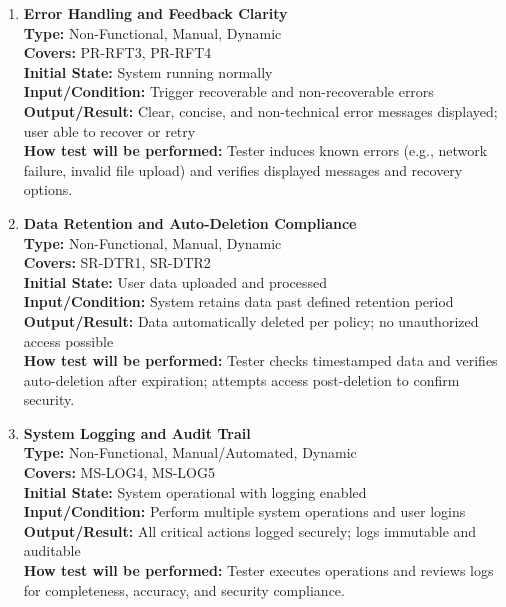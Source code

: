 \documentclass[12pt, titlepage]{article}
\begin{document}
\begin{enumerate}[label=NFR-ST \arabic*., wide=0pt, leftmargin=*]
  \item \textbf{Error Handling and Feedback Clarity} \\[2mm]
    \textbf{Type:} Non-Functional, Manual, Dynamic \\
    \textbf{Covers:} PR-RFT3, PR-RFT4 \\
    \textbf{Initial State:} System running normally \\
    \textbf{Input/Condition:} Trigger recoverable and non-recoverable errors \\
    \textbf{Output/Result:} Clear, concise, and non-technical error
    messages displayed; user able to recover or retry \\[2mm]
    \textbf{How test will be performed:} Tester induces known errors
    (e.g., network failure, invalid file upload) and verifies
    displayed messages and recovery options.

  \item \textbf{Data Retention and Auto-Deletion Compliance} \\[2mm]
    \textbf{Type:} Non-Functional, Manual, Dynamic \\
    \textbf{Covers:} SR-DTR1, SR-DTR2 \\
    \textbf{Initial State:} User data uploaded and processed \\
    \textbf{Input/Condition:} System retains data past defined
    retention period \\
    \textbf{Output/Result:} Data automatically deleted per policy; no
    unauthorized access possible \\[2mm]
    \textbf{How test will be performed:} Tester checks timestamped
    data and verifies auto-deletion after expiration; attempts access
    post-deletion to confirm security.

  \item \textbf{System Logging and Audit Trail} \\[2mm]
    \textbf{Type:} Non-Functional, Manual/Automated, Dynamic \\
    \textbf{Covers:} MS-LOG4, MS-LOG5 \\
    \textbf{Initial State:} System operational with logging enabled \\
    \textbf{Input/Condition:} Perform multiple system operations and
    user logins \\
    \textbf{Output/Result:} All critical actions logged securely;
    logs immutable and auditable \\[2mm]
    \textbf{How test will be performed:} Tester executes operations
    and reviews logs for completeness, accuracy, and security compliance.


\end{enumerate}
\end{document}
